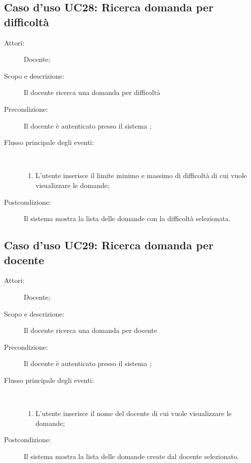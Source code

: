 \subsection{Caso d'uso UC28: Ricerca domanda per difficoltà}\begin{description}
	\item[Attori:] Docente;
	\item[Scopo e descrizione:] Il docente ricerca una domanda per difficoltà
	
	\item[Precondizione:] Il docente è autenticato presso il sistema
	;
	
	\item[Flusso principale degli eventi:] \ 
	\begin{enumerate}
		\item L'utente inserisce il limite minimo e massimo di difficoltà di cui vuole visualizzare le domande;
		
	\end{enumerate}
	\item[Postcondizione:] Il sistema mostra la lista delle domande con la difficoltà selezionata.
\end{description}
\hypertarget{UC29}{}
\subsection{Caso d'uso UC29: Ricerca domanda per docente}\begin{description}
	\item[Attori:] Docente;
	\item[Scopo e descrizione:] Il docente ricerca una domanda per docente
	\item[Precondizione:] Il docente è autenticato presso il sistema
	;
	
	\item[Flusso principale degli eventi:] \ 
	\begin{enumerate}
		\item L'utente inserisce il nome del docente di cui vuole visualizzare le domande;
		
	\end{enumerate}
	\item[Postcondizione:] Il sistema mostra la lista delle domande create dal docente selezionato.
\end{description}
\hypertarget{UC30}{}
